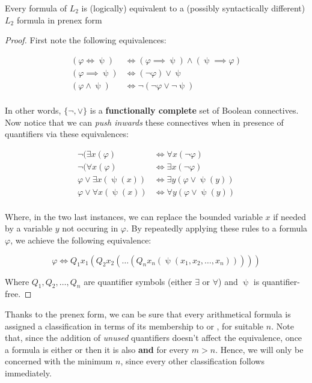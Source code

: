 \documentclass[../main.tex]{memoir}
\begin{document}
\begin{theorem}
  Every formula of $L_2$ is (logically) equivalent to a (possibly syntactically different) $L_2$ formula in prenex form
\end{theorem}
\begin{proof}
  First note the following equivalences:

  \begin{align*}
    (\varphi \iff \uppsi) & \iff (\varphi \implies \uppsi) \land (\uppsi \implies \varphi) \\
    (\varphi \implies \uppsi) & \iff (\neg \varphi) \lor \uppsi \\
    (\varphi \land \uppsi) & \iff \neg (\neg \varphi \lor \neg \uppsi) \\
  \end{align*}

  In other words, $\{\neg, \lor\}$ is a \textbf{functionally complete} set of Boolean connectives. Now notice that we can \textit{push inwards} these connectives when in presence of quantifiers via these equivalences:

  \begin{align*}
    \neg (\exists x (\varphi) & \iff \forall x (\neg \varphi) \\
    \neg (\forall x (\varphi) & \iff \exists x (\neg \varphi) \\
    \varphi \lor \exists x (\uppsi(x)) & \iff \exists y (\varphi \lor \uppsi(y)) \\
    \varphi \lor \forall x (\uppsi(x)) & \iff \forall y (\varphi \lor \uppsi(y)) \\
  \end{align*}

  Where, in the two last instances, we can replace the bounded variable $x$ if needed by a variable $y$ not occuring in $\varphi$. By repeatedly applying these rules to a formula $\varphi$, we achieve the following equivalence:

  \[
    \varphi \iff Q_1 x_1 (Q_2 x_2 (\ldots (Q_n x_n (\uppsi(x_1, x_2, \ldots, x_n)))))
  \]

  Where $Q_1, Q_2, \ldots, Q_n$ are quantifier symbols (either $\exists$ or $\forall$) and $\uppsi$ is quantifier-free.
\end{proof}

Thanks to the prenex form, we can be sure that every arithmetical formula is assigned a classification in terms of its membership to  or , for suitable $n$. Note that, since the addition of \textit{unused} quantifiers doesn't affect the equivalence, once a formula is either  or  then it is also  \textbf{and}  for every $m > n$. Hence, we will only be concerned with the minimum $n$, since every other classification follows immediately. \\
\end{document}
